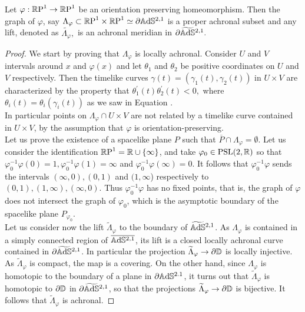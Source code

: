 \begin{lemma}
    Let $\varphi:\mathbb{R}\text{P}^1\to\mathbb{R}\text{P}^1$ be an orientation preserving homeomorphism. Then the graph of $\varphi$, say $\Lambda_\varphi\subset \mathbb{R}\text{P}^1\times\mathbb{R}\text{P}^1\simeq\partial\mathbb{A}\mathrm{d}\mathbb{S}^{2,1}$ is a proper achronal subset and any lift, denoted as $\widetilde{\Lambda_\varphi},$ is an achronal meridian in $\partial\widetilde{\mathbb{A}\mathrm{d}\mathbb{S}}{}^{2,1}.$  
\end{lemma}
\begin{proof}
    We start by proving that $\Lambda_\varphi$ is locally achronal. Consider $U$ and $V$ intervals around $x$ and $\varphi(x)$ and let $\theta_1$ and $\theta_2$ be positive coordinates on $U$ and $V$ respectively. Then the timelike curves $\gamma(t)=(\gamma_1(t),\gamma_2(t))$ in $U\times V$ are characterized by the property that $\theta_1^{\prime} (t)\theta_2^{\prime} (t)<0,$ where $\theta_i(t)=\theta_i(\gamma_i(t))$ as we saw in Equation . \\
    In particular points on $\Lambda_\varphi\cap U\times V$ are not related by a timelike curve contained in $U\times V$, by the assumption that $\varphi$ is orientation-preserving. \\
    Let us prove the existence of a spacelike plane $P$ such that $\overline{P}\cap \Lambda_\varphi=\emptyset.$ Let us consider the identification $\mathbb{R}\textup{P}^1=\mathbb{R}\cup\{\infty\}$, and take $\varphi_0\in\text{PSL}(2,\mathbb{R})$ so that $\varphi_0^{-1}\varphi(0)=1, \varphi_0^{-1}\varphi(1)=\infty$ and $\varphi_0^{-1}\varphi(\infty)=0.$ It follows that $\varphi_0^{-1}\varphi$ sends the intervals $(\infty,0), (0,1)$ and $(1,\infty$) respectively to $(0,1),(1,\infty),(\infty,0)$. Thus $\varphi_0^{-1}\varphi$ has no fixed points, that is, the graph of $\varphi$ does not intersect the graph of $\varphi_0$, which is the asymptotic boundary of the spacelike plane $P_{\varphi_0}.$\\
    Let us consider now the lift $\widetilde{\Lambda}_\varphi$ to the boundary of $\widetilde{\mathbb{A}\mathrm{d}\mathbb{S}}{}^{2,1}$. As $\Lambda_\varphi$ is contained in a simply connected region of $\overline{\mathbb{A}\mathrm{d}\mathbb{S}^{2,1}}$, its lift is a closed locally achronal curve contained in $\partial\widetilde{\mathbb{A}\mathrm{d}\mathbb{S}}{}^{2,1}$. In particular the projection $\widetilde{\Lambda}_\varphi\to\partial\mathbb{D}$ is locally injective. As $\widetilde{\Lambda}_\varphi$ is compact, the map is a covering. On the other hand, since $\Lambda_\varphi$ is homotopic to the boundary of a plane in $\partial\mathbb{A}\mathrm{d}\mathbb{S}^{2.1}$, it turns out that $\widetilde{\Lambda}_\varphi$ is homotopic to $\partial\mathbb{D}$ in $\partial\widetilde{\mathbb{A}\mathrm{d}\mathbb{S}}{}^{2,1}$, so that the projections $\widetilde{\Lambda}_\varphi\to\partial\mathbb{D}$ is bijective. It follows that $\widetilde{\Lambda}_\varphi$ is achronal.  
\end{proof}

